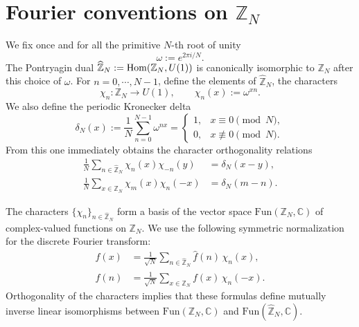 \appendix




\section{Fourier conventions on \texorpdfstring{$\mathbb Z_N$}{Z_N}}
\label{app:fourier-ZN}

We fix once and for all the primitive \(N\)-th root of unity
\begin{equation}
	\omega := e^{2\pi i/N}.
\end{equation}
The Pontryagin dual \(\widehat{\mathbb Z}_N := \mathrm{Hom}(\mathbb Z_N, U(1))\) is canonically isomorphic to \(\mathbb Z_N\) after this choice of \(\omega\). For $n=0,\cdots,N-1$, define the elements of $\widehat{\mathbb Z}_N$, the characters
\begin{equation}
	\chi_n: \mathbb Z_N \to U(1), \qquad \chi_n(x) := \omega^{xn}. \label{eq:ZNcharacter}
\end{equation}
We also define the periodic Kronecker delta
\begin{equation}
	\delta_N(x) := \frac{1}{N}\sum_{n=0}^{N-1}\omega^{nx} =
	\begin{cases}
		1, & x\equiv 0 \pmod N,\\
		0, & x\not\equiv 0 \pmod N.
	\end{cases}
	\label{eq:deltaN}
\end{equation}
From this one immediately obtains the character orthogonality relations
\begin{align}
	\frac{1}{N}\sum_{n\in \widehat{\mathbb Z}_N}\chi_n(x)\chi_{-n}(y)
	&=
	\delta_N(x-y),
	\label{eq:character-orthogonality-x}
	\\
	\frac{1}{N}\sum_{x\in \mathbb Z_N}\chi_m(x)\chi_n(-x)
	&=
	\delta_N(m-n).
	\label{eq:character-orthogonality-n}
\end{align}


The characters \(\{\chi_n\}_{n\in \widehat{\mathbb Z}_N}\) form a basis of the vector space
\(\mathrm{Fun}(\mathbb Z_N,\mathbb C)\) of complex-valued functions on \(\mathbb Z_N\).
We use the following symmetric normalization for the discrete Fourier transform:
\begin{subequations}
	\begin{align}
		f(x)
		&=
		\frac{1}{\sqrt N}\sum_{n\in \widehat{\mathbb Z}_N}\hat f(n)\,\chi_n(x),
		\label{eq:FT}
		\\
		\hat f(n)
		&=
		\frac{1}{\sqrt N}\sum_{x\in \mathbb Z_N}f(x)\,\chi_n(-x).
		\label{eq:invFT}
	\end{align}
\end{subequations}
Orthogonality of the characters implies that these formulas define mutually inverse linear isomorphisms between $\mathrm{Fun}(\mathbb Z_N,\mathbb C)$ and $\mathrm{Fun}(\widehat{\mathbb Z}_N,\mathbb C)$.







